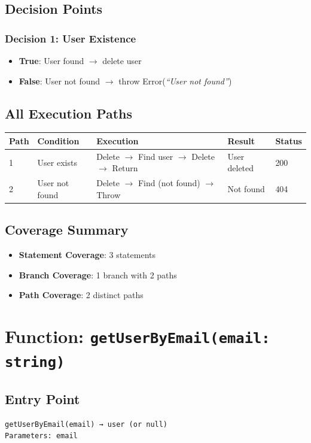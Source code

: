 \subsection{Decision Points}

\subsubsection{Decision 1: User Existence}
\begin{itemize}
    \item \textbf{True}: User found $\rightarrow$ delete user
    \item \textbf{False}: User not found $\rightarrow$ throw Error(\textit{``User not found''})
\end{itemize}

\subsection{All Execution Paths}

\begin{longtable}{|L{0.8cm}|L{3cm}|L{5.5cm}|L{2.5cm}|L{1.2cm}|}
\hline
\textbf{Path} & \textbf{Condition} & \textbf{Execution} & \textbf{Result} & \textbf{Status} \\
 & User exists & Delete $\rightarrow$ Find user $\rightarrow$ Delete $\rightarrow$ Return & User deleted & 200 \\
 & User not found & Delete $\rightarrow$ Find (not found) $\rightarrow$ Throw & Not found & 404 \\
\hline
\end{longtable}

\subsection{Coverage Summary}
\begin{itemize}
    \item \textbf{Statement Coverage}: 3 statements
    \item \textbf{Branch Coverage}: 1 branch with 2 paths
    \item \textbf{Path Coverage}: 2 distinct paths
\end{itemize}

\section{Function: \texttt{getUserByEmail(email: string)}}

\subsection{Entry Point}
\begin{verbatim}
getUserByEmail(email) → user (or null)
Parameters: email
\end{verbatim}

